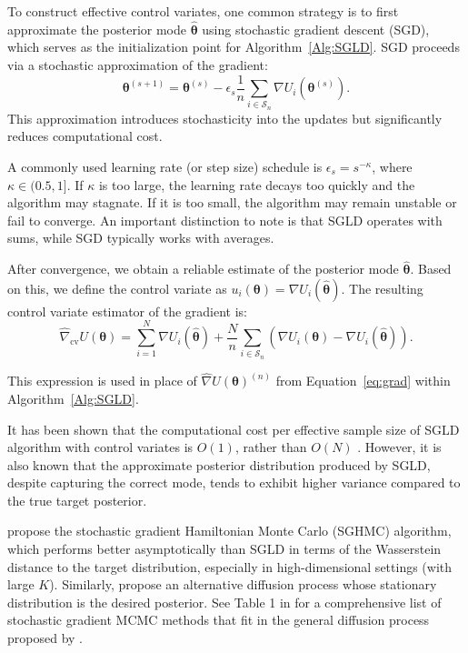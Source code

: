 To construct effective control variates, one common strategy is to first approximate the posterior mode \( \hat{\boldsymbol{\theta}} \) using stochastic gradient descent (SGD), which serves as the initialization point for Algorithm~\ref{Alg:SGLD}. SGD proceeds via a stochastic approximation of the gradient:
\[
\boldsymbol{\theta}^{(s+1)} = \boldsymbol{\theta}^{(s)} - \epsilon_s \frac{1}{n} \sum_{i \in \mathcal{S}_n} \nabla U_i(\boldsymbol{\theta}^{(s)}).
\]
This approximation introduces stochasticity into the updates but significantly reduces computational cost.

A commonly used learning rate (or step size) schedule is \( \epsilon_s = s^{-\kappa} \), where \( \kappa \in (0.5, 1] \). If \( \kappa \) is too large, the learning rate decays too quickly and the algorithm may stagnate. If it is too small, the algorithm may remain unstable or fail to converge. An important distinction to note is that SGLD operates with sums, while SGD typically works with averages.

After convergence, we obtain a reliable estimate of the posterior mode \( \hat{\boldsymbol{\theta}} \). Based on this, we define the control variate as \( u_i(\boldsymbol{\theta}) = \nabla U_i(\hat{\boldsymbol{\theta}}) \). The resulting control variate estimator of the gradient is:
\[
\hat{\nabla}_{\text{cv}} U(\boldsymbol{\theta}) = \sum_{i=1}^N \nabla U_i(\hat{\boldsymbol{\theta}}) + \frac{N}{n} \sum_{i \in \mathcal{S}_n} \left( \nabla U_i(\boldsymbol{\theta}) - \nabla U_i(\hat{\boldsymbol{\theta}}) \right).
\]

This expression is used in place of \( \hat{\nabla} U(\boldsymbol{\theta})^{(n)} \) from Equation~\ref{eq:grad} within Algorithm~\ref{Alg:SGLD}.

It has been shown that the computational cost per effective sample size of SGLD algorithm with control variates is \( O(1) \), rather than \( O(N) \) \cite{nemeth2021stochastic}. However, it is also known that the approximate posterior distribution produced by SGLD, despite capturing the correct mode, tends to exhibit higher variance compared to the true target posterior.

\cite{chen2014stochastic} propose the stochastic gradient Hamiltonian Monte Carlo (SGHMC) algorithm, which performs better asymptotically than SGLD in terms of the Wasserstein distance to the target distribution, especially in high-dimensional settings (with large \( K \)). Similarly, \cite{ma2015complete} propose an alternative diffusion process whose stationary distribution is the desired posterior. See Table 1 in \cite{nemeth2021stochastic} for a comprehensive list of stochastic gradient MCMC methods that fit in the general diffusion process proposed by \cite{ma2015complete}.

